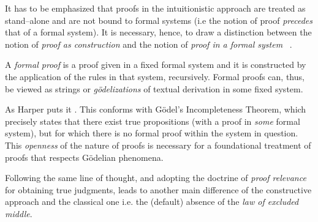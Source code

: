 It has to be emphasized that proofs in the intuitionistic approach 
 are treated as stand--alone and are not bound to formal systems 
(i.e the notion of proof \textit{precedes} that of a 
formal system). 
It is necessary, hence, to draw a distinction between
 the notion of 
 \emph{proof as construction} and the 
  notion of \emph{proof in a formal system} 
 ~\cite{Harper2013,Harper2012}.

A \emph{formal proof}
is a proof given in a fixed formal system and it is constructed
by the application of the rules in that system, recursively. 
Formal proofs can, thus, be viewed as strings or \textit{g\"{o}delizations} of textual derivation in some fixed system. 

As Harper puts it .  
This conforms with G\"{o}del's Incompleteness Theorem, which precisely states that there
exist true propositions (with a proof in \emph{some} formal system), but for which 
there is no formal proof within the system in question. 
This \emph{openness} of the nature of proofs is necessary for a foundational 
treatment of proofs that respects  G\"{o}delian phenomena.

Following the same line of thought, and adopting the doctrine of \emph{proof relevance} 
for obtaining true judgments, leads to another main difference of the constructive 
approach and the classical one i.e. the (default) absence of the 
\emph{law of excluded middle}. 


